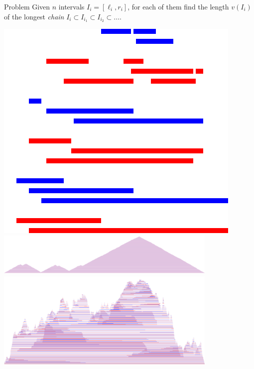 \begin{frame}
    \frametitle{\problemtitle}
    \begin{block}{Problem}
        Given $n$ intervals $I_i=[\ell_i, r_i]$, for each of them find the length
        $v(I_i)$ of
        the longest \emph{chain} $I_i \subset I_{i_1} \subset I_{i_2}\subset \dots$.
      \end{block}

    \vspace{1em}

    \begin{overprint}
      \centering
      \includegraphics[height=0.6\textheight]{./visuals/1.png}
      \centering
      \includegraphics[width=0.8\textwidth]{./visuals/2.png}
      \centering
      \includegraphics[width=0.8\textwidth]{./visuals/3.png}
    \end{overprint}
    \solvestats

\end{frame}

